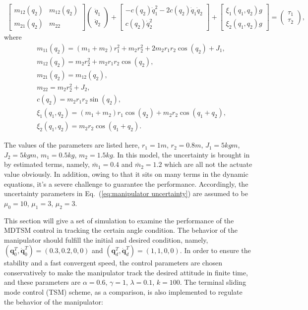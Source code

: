 \documentclass[3p]{elsarticle}
\theoremstyle{plain}
\theoremstyle{remark}
\begin{document}
\begin{align}
\begin{bmatrix}
m_{12}(q_2) &m_{12}(q_2)\\
m_{21}(q_2) &m_{22}
\end{bmatrix}
\begin{pmatrix}
\ddot q_1\\
\ddot q_2
\end{pmatrix}
+
\begin{bmatrix}
-c(q_2)\dot q_1^2-2c(q_2)\dot q_1\dot q_2\\
c(q_2)\dot q_2^2
\end{bmatrix}+
\begin{bmatrix}
\xi_1(q_1,q_2) g\\
\xi_2(q_1,q_2) g
\end{bmatrix}=
\begin{pmatrix}
\tau_1\\
\tau_2
\end{pmatrix},
\end{align}
where
\begin{align*}
&m_{11}(q_2)=(m_1+m_2)r_1^2+m_2r_2^2+2m_2r_1r_2\cos(q_2)+J_1,\\
&m_{12}(q_2)=m_2r_2^2+m_2r_1r_2\cos(q_2),\\
&m_{21}(q_2)=m_{12}(q_2),\\
&m_{22}=m_2r_2^2+J_2,\\
&c(q_2)=m_2r_1r_2\sin(q_2),\\
&\xi_1(q_1,q_2) =(m_1+m_2)r_1\cos(q_2)+m_2r_2\cos(q_1+q_2),\\
&\xi_2(q_1,q_2) = m_2r_2\cos(q_1+q_2).
\end{align*}\par
The values of the parameters are listed here, $r_1=1m$, $r_2=0.8m$, $J_1=5 kgm$, $J_2=5kgm$, $m_1=0.5kg$, $m_2=1.5kg$. In this model, the uncertainty is brought in by estimated terms, namely, $\bar m_1=0.4$ and $\bar m_2=1.2$ which are all not the actuate value obviously. In addition, owing to that it sits on many terms in the dynamic equations, it's a severe challenge to guarantee the performance. Accordingly, the uncertainty parameters in Eq.~(\ref{eq:manipulator uncertainty}) are assumed to be $\mu_0=10$, $\mu_1=3$, $\mu_2=3$.\par
This section will give a set of simulation to examine the performance of the MDTSM control in tracking the certain angle condition. The behavior of the manipulator should fulfill the initial and desired condition, namely, $(\bm q_0^T, \dot{\bm q}_0^T)= (0.3,0.2,0,0)$ and $({\bm q}_d^T,\dot{\bm q}_d^T)=(1,1,0,0)$. In order to ensure the stability and a fast convergent speed, the control parameters are chosen conservatively to make the manipulator track the desired attitude in finite time, and these parameters are $\alpha = 0.6$, $\gamma = 1$, $\lambda = 0.1$, $k = 100$. The terminal sliding mode control (TSM) scheme, as a comparison, is also implemented to regulate the behavior of the manipulator:
\end{document}
